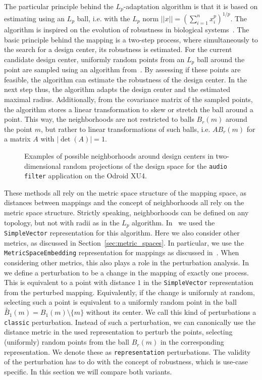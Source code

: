 The particular principle behind the $L_p$-adaptation algorithm is that it is based on estimating using an $L_p$ ball, i.e. with the $L_p$ norm $||x|| = (\sum_{i=1}^n x_i^p)^{1/p}$.
The algorithm is inspired on the evolution of robustness in biological systems~\cite{asmus2017lp}.
The basic principle behind the mapping is a two-step process, where simultaneously to the search for a design center, its robustness is estimated.
For the current candidate design center, uniformly random points from an $L_p$ ball around the point are sampled using an algorithm from~\cite{calafiore1998uniform}.
By assessing if these points are feasible, the algorithm can estimate the robustness of the design center.
In the next step thus, the algorithm adapts the design center and the estimated maximal radius.
Additionally, from the covariance matrix of the sampled points, the algorithm stores a linear transformation to skew or stretch the ball around a point.
This way, the neighborhoods are not restricted to balls $B_r(m)$ around the point $m$, but rather to linear transformations of such balls, i.e. $A B_r(m)$ for a matrix $A$ with $|\operatorname{det}(A)| = 1$.

\begin{figure}[h]
	\centering
	\caption{Examples of possible neighborhoods around design centers in two-dimensional random projections of the design space for the \texttt{audio filter} application on the Odroid XU4.}
	\label{fig:design_centering_exynos}
\end{figure}



These methods all rely on the metric space structure of the mapping space, as distances between mappings and the concept of neighborhoods all rely on the metric space structure.
Strictly speaking, neighborhoods can be defined on any topology, but not with radii as in the $L_p$ algorithm.
In~\cite{hempel_scopes17} we used the \texttt{SimpleVector} representation for this algorithm.
Here we also consider other metrics, as discussed in Section~\ref{sec:metric_spaces}.
In particular, we use the \texttt{MetricSpaceEmbedding} representation for mappings as discussed in~\cite{sec:representations}.
When considering other metrics, this also plays a role in the perturbation analysis.
In~\cite{hempel_scopes17} we define a perturbation to be a change in the mapping of exactly one process.
This is equivalent to a point with distance $1$ in the \texttt{SimpleVector} representation from the perturbed mapping.
Equivalently, if the change is uniformly at random, selecting such a point is equivalent to a uniformly random point in the ball $\overset{\circ}{B}_1(m) = B_1(m) \setminus \{ m \}$ without its center.
We call this kind of perturbations a \texttt{classic} perturbation.
Instead of such a perturbation, we can canonically use the distance metric in the used representation to perturb the points, selecting (uniformly) random points from the ball $B_r(m)$ in the corresponding representation.
We denote these as \texttt{representation} perturbations.
The validity of the perturbation has to do with the concept of robustness, which is use-case specific.
In this section we will compare both variants.

